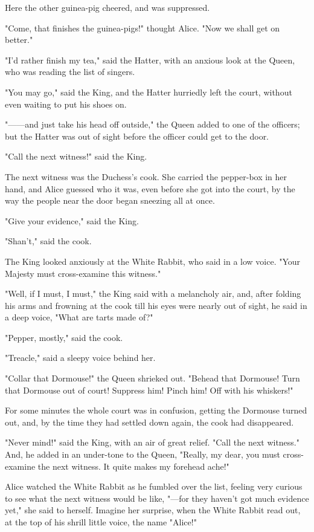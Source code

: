 ​Here the other guinea-pig cheered, and was suppressed.

"Come, that finishes the guinea-pigs!" thought Alice. "Now we shall get on better."

"I'd rather finish my tea," said the Hatter, with an anxious look at the Queen, who was reading the list of singers.

"You may go," said the King, and the Hatter hurriedly left the court, without even waiting to put his shoes on.

"——and just take his head off outside," the ​Queen added to one of the officers; but the Hatter was out of sight before the officer could get to the door.

"Call the next witness!" said the King.

The next witness was the Duchess's cook. She carried the pepper-box in her hand, and Alice guessed who it was, even before she got into the court, by the way the people near the door began sneezing all at once.

"Give your evidence," said the King.

"Shan't," said the cook.

The King looked anxiously at the White Rabbit, who said in a low voice. "Your Majesty must cross-examine this witness."

"Well, if I must, I must," the King said with a melancholy air, and, after folding his arms and frowning at the cook till his eyes were nearly out of sight, he said in a deep voice, "What are tarts made of?"

"Pepper, mostly," said the cook.

"Treacle," said a sleepy voice behind her.

"Collar that Dormouse!" the Queen shrieked ​out. "Behead that Dormouse! Turn that Dormouse out of court! Suppress him! Pinch him! Off with his whiskers!"

For some minutes the whole court was in confusion, getting the Dormouse turned out, and, by the time they had settled down again, the cook had disappeared.

"Never mind!" said the King, with an air of great relief. "Call the next witness." And, he added in an under-tone to the Queen, "Really, my dear, you must cross-examine the next witness. It quite makes my forehead ache!"

Alice watched the White Rabbit as he fumbled over the list, feeling very curious to see what the next witness would be like, "—for they haven't got much evidence yet," she said to herself. Imagine her surprise, when the White Rabbit read out, at the top of his shrill little voice, the name "Alice!"

